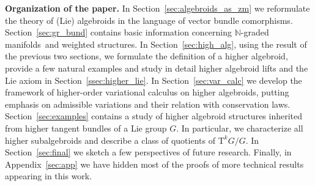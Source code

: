 \documentclass[10pt,a4paper]{amsart}
\newcommand{\grBs}{{$\N$-graded manifolds}}
\newcommand{\Zakrzewski}{{vector bundle comorphism}}
\newcommand{\N}{\mathbb{N}}
\newcommand{\TT}[1]{\mathrm{T}^{#1}} %
\numberwithin{equation}{section}
\theoremstyle{definition}
\begin{document}
{\bf Organization of the paper.} In Section~\ref{sec:algebroids_as_zm} we reformulate the theory of (Lie) algebroids in the language of \Zakrzewski s. Section~\ref{sec:gr_bund} contains basic information concerning \grBs\ and weighted structures. In Section~\ref{sec:high_alg}, using the result of the previous two sections, we formulate the definition of a higher algebroid, provide a few natural examples and study in detail higher algebroid lifts and the Lie axiom in Section~\ref{ssec:higher_lie}. In Section~\ref{sec:var_calc} we develop the framework of higher-order variational calculus on higher algebroids, putting emphasis on admissible variations and their relation with conservation laws. Section~\ref{sec:examples} contains a study of higher algebroid structures inherited from higher tangent bundles of a Lie group $G$. In particular, we characterize all higher subalgebroids and describe a class of quotients of $\TT{k} G/G$. In Section~\ref{sec:final} we sketch a few perspectives of future research. Finally, in Appendix~\ref{sec:app} we have hidden most of the proofs of more technical results appearing in this work.
\end{document}
